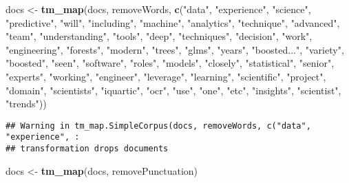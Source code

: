 \documentclass[]{article}
\newenvironment{Shaded}{\begin{snugshade}}{\end{snugshade}}
\newcommand{\KeywordTok}[1]{\textcolor[rgb]{0.13,0.29,0.53}{\textbf{#1}}}
\newcommand{\NormalTok}[1]{#1}
\newcommand{\StringTok}[1]{\textcolor[rgb]{0.31,0.60,0.02}{#1}}
\begin{document}
\begin{Shaded}
\begin{Highlighting}[]
\NormalTok{docs <-}\StringTok{ }\KeywordTok{tm_map}\NormalTok{(docs, removeWords, }\KeywordTok{c}\NormalTok{(}\StringTok{"data"}\NormalTok{, }\StringTok{"experience"}\NormalTok{, }\StringTok{"science"}\NormalTok{, }\StringTok{"predictive"}\NormalTok{, }\StringTok{"will"}\NormalTok{, }\StringTok{"including"}\NormalTok{, }\StringTok{"machine"}\NormalTok{, }\StringTok{"analytics"}\NormalTok{, }\StringTok{"technique"}\NormalTok{, }\StringTok{"advanced"}\NormalTok{, }\StringTok{"team"}\NormalTok{, }\StringTok{"understanding"}\NormalTok{, }\StringTok{"tools"}\NormalTok{, }\StringTok{"deep"}\NormalTok{, }\StringTok{"techniques"}\NormalTok{, }\StringTok{"decision"}\NormalTok{, }\StringTok{"work"}\NormalTok{, }\StringTok{"engineering"}\NormalTok{, }\StringTok{"forests"}\NormalTok{, }\StringTok{"modern"}\NormalTok{, }\StringTok{"trees"}\NormalTok{, }\StringTok{"glms"}\NormalTok{, }\StringTok{"years"}\NormalTok{, }\StringTok{"boosted..."}\NormalTok{, }\StringTok{"variety"}\NormalTok{, }\StringTok{"boosted"}\NormalTok{, }\StringTok{"seen"}\NormalTok{, }\StringTok{"software"}\NormalTok{, }\StringTok{"roles"}\NormalTok{, }\StringTok{"models"}\NormalTok{, }\StringTok{"closely"}\NormalTok{, }\StringTok{"statistical"}\NormalTok{, }\StringTok{"senior"}\NormalTok{, }\StringTok{"experts"}\NormalTok{, }\StringTok{"working"}\NormalTok{, }\StringTok{"engineer"}\NormalTok{, }\StringTok{"leverage"}\NormalTok{, }\StringTok{"learning"}\NormalTok{, }\StringTok{"scientific"}\NormalTok{, }\StringTok{"project"}\NormalTok{, }\StringTok{"domain"}\NormalTok{, }\StringTok{"scientists"}\NormalTok{, }\StringTok{"iquartic"}\NormalTok{, }\StringTok{"ocr"}\NormalTok{, }\StringTok{"use"}\NormalTok{, }\StringTok{"one"}\NormalTok{, }\StringTok{"etc"}\NormalTok{, }\StringTok{"insights"}\NormalTok{, }\StringTok{"scientist"}\NormalTok{, }\StringTok{"trends"}\NormalTok{))}
\end{Highlighting}
\end{Shaded}

\begin{verbatim}
## Warning in tm_map.SimpleCorpus(docs, removeWords, c("data", "experience", :
## transformation drops documents
\end{verbatim}

\begin{Shaded}
\begin{Highlighting}[]
\NormalTok{docs <-}\StringTok{ }\KeywordTok{tm_map}\NormalTok{(docs, removePunctuation)}
\end{Highlighting}
\end{Shaded}
\end{document}
